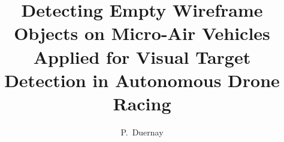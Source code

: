 \documentclass{tudelft-report}
\begin{document}
\frontmatter

\title[]{Detecting Empty Wireframe Objects on Micro-Air Vehicles \\ { \small Applied for Visual Target Detection in Autonomous Drone Racing}}
\author{P.\ Duernay}





\tableofcontents

\mainmatter




%



%
%
%


%
%




\end{document}
